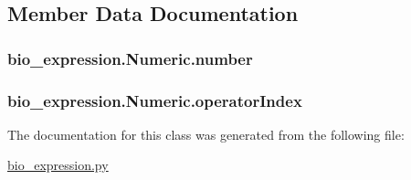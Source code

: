 \subsection{Member Data Documentation}
\hypertarget{classbio__expression_1_1_numeric_a61e657d4d757ba789c0e858d4f71d197}{
\subsubsection[{number}]{\setlength{\rightskip}{0pt plus 5cm}bio\+\_\+expression.\+Numeric.\+number}}\label{classbio__expression_1_1_numeric_a61e657d4d757ba789c0e858d4f71d197}
\hypertarget{classbio__expression_1_1_numeric_a2536119ab49b2aefa2241202b0d73b19}{
\subsubsection[{operator\+Index}]{\setlength{\rightskip}{0pt plus 5cm}bio\+\_\+expression.\+Numeric.\+operator\+Index}}\label{classbio__expression_1_1_numeric_a2536119ab49b2aefa2241202b0d73b19}


The documentation for this class was generated from the following file\+:\begin{DoxyCompactItemize}
\item 
\hyperlink{bio__expression_8py}{bio\+\_\+expression.\+py}\end{DoxyCompactItemize}
